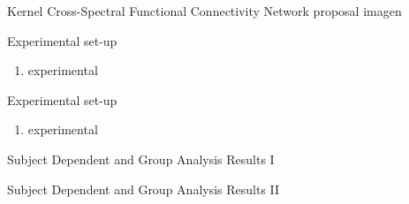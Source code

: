 \documentclass[aspectratio=169]{beamer}
\begin{document}
\begin{frame}[allowframebreaks]{Kernel Cross-Spectral Functional Connectivity Network proposal}
    imagen
\end{frame}

\begin{frame}{Experimental set-up}
    \begin{enumerate}
        \item experimental
    \end{enumerate}
\end{frame}

\begin{frame}{Experimental set-up}
    \begin{enumerate}
        \item experimental
    \end{enumerate}
\end{frame}

\begin{frame}{Subject Dependent and Group Analysis Results I}
    \centering
    \resizebox{0.7\linewidth}{!}{}
\end{frame}

\begin{frame}{Subject Dependent and Group Analysis Results II}
    \centering
    \resizebox{0.7\linewidth}{!}{}
\end{frame}
\end{document}
